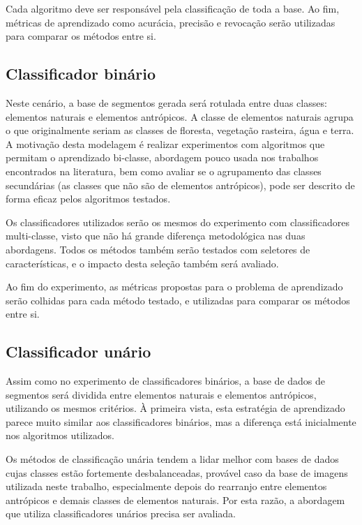 Cada algoritmo deve ser responsável pela classificação de toda a base. Ao fim, métricas de aprendizado como acurácia, precisão e revocação serão utilizadas para comparar os métodos entre si.

\subsection{Classificador binário}

Neste cenário, a base de segmentos gerada será rotulada entre duas classes: elementos naturais e elementos antrópicos. A classe de elementos naturais agrupa o que originalmente seriam as classes de floresta, vegetação rasteira, água e terra. A motivação desta modelagem é realizar experimentos com algoritmos que permitam o aprendizado bi-classe, abordagem pouco usada nos trabalhos encontrados na literatura, bem como avaliar se o agrupamento das classes secundárias (as classes que não são de elementos antrópicos), pode ser descrito de forma eficaz pelos algoritmos testados.

Os classificadores utilizados serão os mesmos do experimento com classificadores multi-classe, visto que não há grande diferença metodológica nas duas abordagens. Todos os métodos também serão testados com seletores de características, e o impacto desta seleção também será avaliado.

Ao fim do experimento, as métricas propostas para o problema de aprendizado serão colhidas para cada método testado, e utilizadas para comparar os métodos entre si.

\subsection{Classificador unário}

Assim como no experimento de classificadores binários, a base de dados de segmentos será dividida entre elementos naturais e elementos antrópicos, utilizando os mesmos critérios. À primeira vista, esta estratégia de aprendizado parece muito similar aos classificadores binários, mas a diferença está inicialmente nos algoritmos utilizados.

Os métodos de classificação unária tendem a lidar melhor com bases de dados cujas classes estão fortemente desbalanceadas, provável caso da base de imagens utilizada neste trabalho, especialmente depois do rearranjo entre elementos antrópicos e demais classes de elementos naturais. Por esta razão, a abordagem que utiliza classificadores unários precisa ser avaliada.

